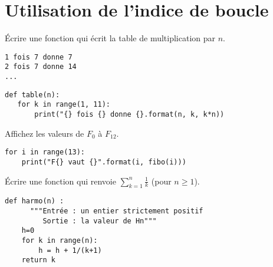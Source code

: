 \section{Utilisation de l'indice de boucle}
\begin{Exercise}[title= Table de multiplication]
Écrire une fonction  qui écrit la table de multiplication par $n$.

\begin{lstlisting}
1 fois 7 donne 7
2 fois 7 donne 14
...
\end{lstlisting}
\end{Exercise}
\begin{Answer}
\begin{lstlisting}
def table(n):
   for k in range(1, 11):
       print("{} fois {} donne {}.format(n, k, k*n))
\end{lstlisting}
\end{Answer}
\begin{Exercise}[title= Suite de Fibonacci : 2]
Affichez les valeurs de $F_0$ à $F_{12}$. 
\end{Exercise}
\begin{Answer}
\begin{lstlisting}
for i in range(13):
    print("F{} vaut {}".format(i, fibo(i)))
\end{lstlisting}
\end{Answer}
\begin{Exercise}[title= Suite harmonique, label=exo:harmo]
Écrire une fonction  qui renvoie $\displaystyle \sum_{k=1}^n \frac 1k$ (pour $n\ge 1$).
\end{Exercise}
\begin{Answer}
\begin{lstlisting}
def harmo(n) :
	  """Entrée : un entier strictement positif
	     Sortie : la valeur de Hn"""
    h=0
    for k in range(n):
        h = h + 1/(k+1)
    return k
\end{lstlisting}
\end{Answer}
